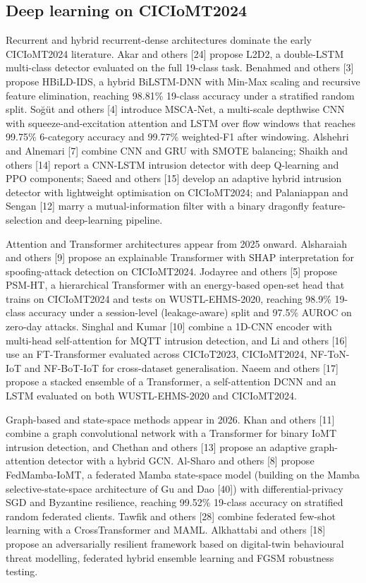 \documentclass[11pt]{article}
\begin{document}
\subsection{Deep learning on CICIoMT2024}
Recurrent and hybrid recurrent-dense architectures dominate the early CICIoMT2024 literature. Akar and others [24] propose L2D2, a double-LSTM multi-class detector evaluated on the full 19-class task. Benahmed and others [3] propose HBiLD-IDS, a hybrid BiLSTM-DNN with Min-Max scaling and recursive feature elimination, reaching 98.81\% 19-class accuracy under a stratified random split. Soğüt and others [4] introduce MSCA-Net, a multi-scale depthwise CNN with squeeze-and-excitation attention and LSTM over flow windows that reaches 99.75\% 6-category accuracy and 99.77\% weighted-F1 after windowing. Alshehri and Alnemari [7] combine CNN and GRU with SMOTE balancing; Shaikh and others [14] report a CNN-LSTM intrusion detector with deep Q-learning and PPO components; Saeed and others [15] develop an adaptive hybrid intrusion detector with lightweight optimisation on CICIoMT2024; and Palaniappan and Sengan [12] marry a mutual-information filter with a binary dragonfly feature-selection and deep-learning pipeline.

Attention and Transformer architectures appear from 2025 onward. Alsharaiah and others [9] propose an explainable Transformer with SHAP interpretation for spoofing-attack detection on CICIoMT2024. Jodayree and others [5] propose PSM-HT, a hierarchical Transformer with an energy-based open-set head that trains on CICIoMT2024 and tests on WUSTL-EHMS-2020, reaching 98.9\% 19-class accuracy under a session-level (leakage-aware) split and 97.5\% AUROC on zero-day attacks. Singhal and Kumar [10] combine a 1D-CNN encoder with multi-head self-attention for MQTT intrusion detection, and Li and others [16] use an FT-Transformer evaluated across CICIoT2023, CICIoMT2024, NF-ToN-IoT and NF-BoT-IoT for cross-dataset generalisation. Naeem and others [17] propose a stacked ensemble of a Transformer, a self-attention DCNN and an LSTM evaluated on both WUSTL-EHMS-2020 and CICIoMT2024.

Graph-based and state-space methods appear in 2026. Khan and others [11] combine a graph convolutional network with a Transformer for binary IoMT intrusion detection, and Chethan and others [13] propose an adaptive graph-attention detector with a hybrid GCN. Al-Sharo and others [8] propose FedMamba-IoMT, a federated Mamba state-space model (building on the Mamba selective-state-space architecture of Gu and Dao [40]) with differential-privacy SGD and Byzantine resilience, reaching 99.52\% 19-class accuracy on stratified random federated clients. Tawfik and others [28] combine federated few-shot learning with a CrossTransformer and MAML. Alkhattabi and others [18] propose an adversarially resilient framework based on digital-twin behavioural threat modelling, federated hybrid ensemble learning and FGSM robustness testing.
\end{document}
